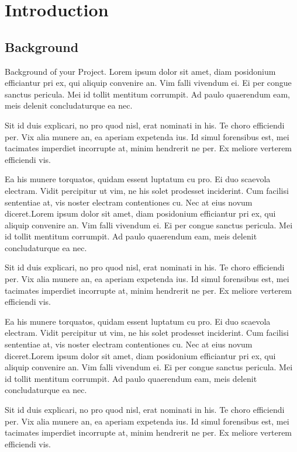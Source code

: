 \KECloa %

\KEClos %

\newpage
{} %

\chapter{Introduction}
\section{Background}\label{sec:bkgrnd}%
Background of your Project. Lorem ipsum dolor sit  amet, diam posidonium efficiantur pri ex, qui aliquip convenire an. Vim falli vivendum ei. Ei per congue sanctus pericula. Mei id tollit mentitum corrumpit. Ad paulo quaerendum eam, meis delenit concludaturque ea nec.\par
Sit id duis explicari, no pro quod nisl, erat nominati in his. Te choro efficiendi per. Vix alia munere an, ea aperiam expetenda ius. Id simul forensibus est, mei tacimates imperdiet incorrupte at, minim hendrerit ne per. Ex meliore verterem efficiendi vis.

Ea his munere torquatos, quidam essent luptatum cu pro. Ei duo scaevola electram. Vidit percipitur ut vim, ne his solet prodesset inciderint. Cum facilisi sententiae at, vis noster electram contentiones cu. Nec at eius novum diceret.Lorem ipsum dolor sit  amet, diam posidonium efficiantur pri ex, qui aliquip convenire an. Vim falli vivendum ei. Ei per congue sanctus pericula. Mei id tollit mentitum corrumpit. Ad paulo quaerendum eam, meis delenit concludaturque ea nec.\par
Sit id duis explicari, no pro quod nisl, erat nominati in his. Te choro efficiendi per. Vix alia munere an, ea aperiam expetenda ius. Id simul forensibus est, mei tacimates imperdiet incorrupte at, minim hendrerit ne per. Ex meliore verterem efficiendi vis.

Ea his munere torquatos, quidam essent luptatum cu pro. Ei duo scaevola electram. Vidit percipitur ut vim, ne his solet prodesset inciderint. Cum facilisi sententiae at, vis noster electram contentiones cu. Nec at eius novum diceret.Lorem ipsum dolor sit  amet, diam posidonium efficiantur pri ex, qui aliquip convenire an. Vim falli vivendum ei. Ei per congue sanctus pericula. Mei id tollit mentitum corrumpit. Ad paulo quaerendum eam, meis delenit concludaturque ea nec.\par
Sit id duis explicari, no pro quod nisl, erat nominati in his. Te choro efficiendi per. Vix alia munere an, ea aperiam expetenda ius. Id simul forensibus est, mei tacimates imperdiet incorrupte at, minim hendrerit ne per. Ex meliore verterem efficiendi vis.

